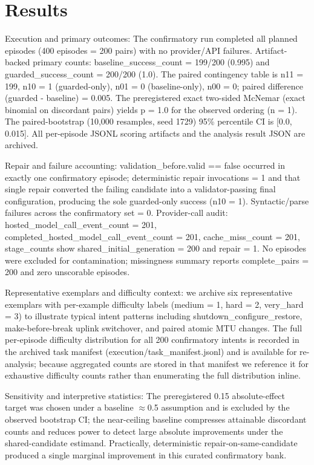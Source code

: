 \documentclass[conference]{IEEEtran}
\begin{document}
\section{Results}
Execution and primary outcomes: The confirmatory run completed all planned episodes (400 episodes = 200 pairs) with no provider/API failures. Artifact-backed primary counts: baseline\_success\_count = 199/200 (0.995) and guarded\_success\_count = 200/200 (1.0). The paired contingency table is n11 = 199, n10 = 1 (guarded-only), n01 = 0 (baseline-only), n00 = 0; paired difference (guarded - baseline) = 0.005. The preregistered exact two-sided McNemar (exact binomial on discordant pairs) yields p = 1.0 for the observed ordering (n = 1). The paired-bootstrap (10,000 resamples, seed 1729) 95\% percentile CI is [0.0, 0.015]. All per-episode JSONL scoring artifacts and the analysis result JSON are archived.

Repair and failure accounting: validation\_before.valid == false occurred in exactly one confirmatory episode; deterministic repair invocations = 1 and that single repair converted the failing candidate into a validator-passing final configuration, producing the sole guarded-only success (n10 = 1). Syntactic/parse failures across the confirmatory set = 0. Provider-call audit: hosted\_model\_call\_event\_count = 201, completed\_hosted\_model\_call\_event\_count = 201, cache\_miss\_count = 201, stage\_counts show shared\_initial\_generation = 200 and repair = 1. No episodes were excluded for contamination; missingness summary reports complete\_pairs = 200 and zero unscorable episodes.

Representative exemplars and difficulty context: we archive six representative exemplars with per-example difficulty labels (medium = 1, hard = 2, very\_hard = 3) to illustrate typical intent patterns including shutdown\_configure\_restore, make-before-break uplink switchover, and paired atomic MTU changes. The full per-episode difficulty distribution for all 200 confirmatory intents is recorded in the archived task manifest (execution/task\_manifest.jsonl) and is available for re-analysis; because aggregated counts are stored in that manifest we reference it for exhaustive difficulty counts rather than enumerating the full distribution inline.

Sensitivity and interpretive statistics: The preregistered 0.15 absolute-effect target was chosen under a baseline \ensuremath{\approx}0.5 assumption and is excluded by the observed bootstrap CI; the near-ceiling baseline compresses attainable discordant counts and reduces power to detect large absolute improvements under the shared-candidate estimand. Practically, deterministic repair-on-same-candidate produced a single marginal improvement in this curated confirmatory bank.
\end{document}
